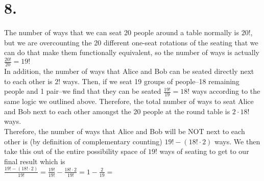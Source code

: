 \documentclass{article}
\begin{document}
\section*{8.}
{\Large 

The number of ways that we can seat 20 people around a table normally is $20!$, but we are overcounting the 20 different one-seat rotations of the seating that we can do that make them functionally equivalent, so the number of ways is actually $\frac{20!}{20} = 19!$ \\
In addition, the number of ways that Alice and Bob can be seated directly next to each other is $2!$ ways. Then, if we seat 19 groups of people--18 remaining people and 1 pair--we find that they can be seated $\frac{19!}{19} = 18!$ ways according to the same logic we outlined above. Therefore, the total number of ways to seat Alice and Bob next to each other amongst the 20 people at the round table is $2 \cdot 18!$ ways. \\
Therefore, the number of ways that Alice and Bob will be NOT next to each other is (by definition of complementary counting) $19! - (18! \cdot 2)$ ways. We then take this out of the entire possibility space of $19!$ ways of seating to get to our final result which is \\
$\frac{19! - (18! \cdot 2) }{19!} = \frac{19!}{19!} - \frac{18! \cdot 2}{19!} = 1 - \frac{2}{19} = $ 

}
\end{document}
